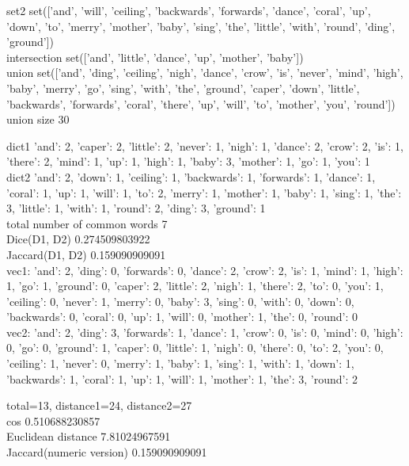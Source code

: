 \documentclass{article}
\begin{document}
set2 set(['and', 'will', 'ceiling', 'backwards', 'forwards', 'dance', 'coral', 'up', 'down', 'to', 'merry', 'mother', 'baby', 'sing', 'the', 'little', 'with', 'round', 'ding', 'ground']) \\

intersection set(['and', 'little', 'dance', 'up', 'mother', 'baby']) \\

union set(['and', 'ding', 'ceiling', 'nigh', 'dance', 'crow', 'is', 'never', 'mind', 'high', 'baby', 'merry', 'go', 'sing', 'with', 'the', 'ground', 'caper', 'down', 'little', 'backwards', 'forwards', 'coral', 'there', 'up', 'will', 'to', 'mother', 'you', 'round']) \\

union size 30

dict1 {'and': 2, 'caper': 2, 'little': 2, 'never': 1, 'nigh': 1, 'dance': 2, 'crow': 2, 'is': 1, 'there': 2, 'mind': 1, 'up': 1, 'high': 1, 'baby': 3, 'mother': 1, 'go': 1, 'you': 1} \\

dict2 {'and': 2, 'down': 1, 'ceiling': 1, 'backwards': 1, 'forwards': 1, 'dance': 1, 'coral': 1, 'up': 1, 'will': 1, 'to': 2, 'merry': 1, 'mother': 1, 'baby': 1, 'sing': 1, 'the': 3, 'little': 1, 'with': 1, 'round': 2, 'ding': 3, 'ground': 1} \\

total number of common words 7 \\

Dice(D1, D2) 0.274509803922 \\
Jaccard(D1, D2) 0.159090909091 \\

vec1: {'and': 2, 'ding': 0, 'forwards': 0, 'dance': 2, 'crow': 2, 'is': 1, 'mind': 1, 'high': 1, 'go': 1, 'ground': 0, 'caper': 2, 'little': 2, 'nigh': 1, 'there': 2, 'to': 0, 'you': 1, 'ceiling': 0, 'never': 1, 'merry': 0, 'baby': 3, 'sing': 0, 'with': 0, 'down': 0, 'backwards': 0, 'coral': 0, 'up': 1, 'will': 0, 'mother': 1, 'the': 0, 'round': 0} \\

vec2: {'and': 2, 'ding': 3, 'forwards': 1, 'dance': 1, 'crow': 0, 'is': 0, 'mind': 0, 'high': 0, 'go': 0, 'ground': 1, 'caper': 0, 'little': 1, 'nigh': 0, 'there': 0, 'to': 2, 'you': 0, 'ceiling': 1, 'never': 0, 'merry': 1, 'baby': 1, 'sing': 1, 'with': 1, 'down': 1, 'backwards': 1, 'coral': 1, 'up': 1, 'will': 1, 'mother': 1, 'the': 3, 'round': 2}

total=13, distance1=24, distance2=27 \\

cos 0.510688230857 \\

Euclidean distance 7.81024967591 \\

Jaccard(numeric version) 0.159090909091 \\
\end{document}
